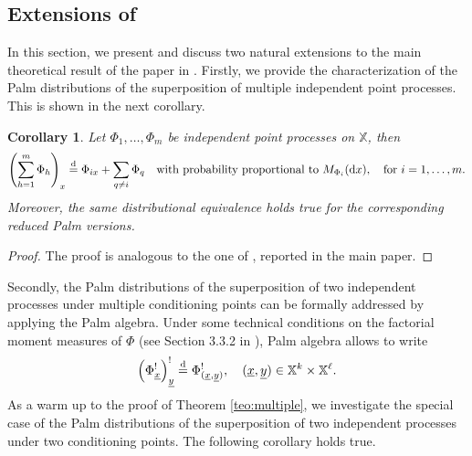 \documentclass[11pt,a4paper,oneside]{article}
\newcommand{\deq}{\stackrel{\mbox{\scriptsize d}}{=}}
\newcommand{\dd}{\mathrm d}
\newcommand{\E}{E}
\newcommand{\X}{\mathbb{X}}
\newtheorem{corollary}{Corollary}
\theoremstyle{definition}
\theoremstyle{remark}
\begin{document}


\subsection{Extensions of }
\label{app:extensions}


In this section, we present and discuss two natural extensions to the main theoretical result of the paper in . Firstly, we provide the characterization of the Palm distributions of the superposition of multiple independent point
processes. This is shown in the next corollary.
\begin{corollary}\label{cor:palm_superposition_multiple_processes}
     Let $\Phi_1, \ldots, \Phi_m$ be independent point processes on $\X$, then
    \[
        \left(\sum_{h=1}^m \Phi_h\right)_x \deq \Phi_{i x} + \sum_{q \neq i} \Phi_q \quad \text{with probability proportional to } M_{\Phi_i}(\dd x), \quad \text{for } i=1,\ldots,m.
    \]
    Moreover, the same distributional equivalence holds true for the corresponding reduced Palm versions.
\end{corollary}
\begin{proof}
    The proof is analogous to the one of , reported in the main paper.
\end{proof}


Secondly, the Palm distributions of the superposition of two independent processes under multiple conditioning points can be formally addressed by applying the Palm algebra. Under some technical conditions on the factorial moment measures of $\Phi$ (see Section 3.3.2 in \cite{BaBlaKa}), Palm algebra allows to write
\begin{equation}\label{eq:palm_algebra}
    \left(\Phi^!_{\underline{x}}\right)^!_{\underline{y}} \deq \Phi^!_{(\underline{x}, \underline{y})}, \quad (\underline{x}, 
    \underline{y}) \in \X^k \times \X^\ell.
\end{equation}
As a warm up to the proof of Theorem \ref{teo:multiple}, we investigate the special case of the Palm distributions of the superposition of two independent processes under two conditioning points. The following corollary holds true.
\end{document}
